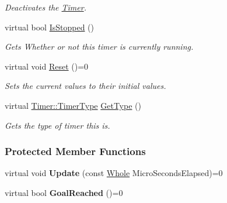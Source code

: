 \begin{DoxyCompactItemize}
\begin{DoxyCompactList}\small\item\em Deactivates the \hyperlink{classphys_1_1Timer}{Timer}. \item\end{DoxyCompactList}\item 
\hypertarget{classphys_1_1Timer_a3cdb46639055107c23c3de971d913ec1}{
virtual bool \hyperlink{classphys_1_1Timer_a3cdb46639055107c23c3de971d913ec1}{IsStopped} ()}
\label{classphys_1_1Timer_a3cdb46639055107c23c3de971d913ec1}

\begin{DoxyCompactList}\small\item\em Gets Whether or not this timer is currently running. \item\end{DoxyCompactList}\item 
\hypertarget{classphys_1_1Timer_a6010a6dab70b542c3e9d5a09caa422f7}{
virtual void \hyperlink{classphys_1_1Timer_a6010a6dab70b542c3e9d5a09caa422f7}{Reset} ()=0}
\label{classphys_1_1Timer_a6010a6dab70b542c3e9d5a09caa422f7}

\begin{DoxyCompactList}\small\item\em Sets the current values to their initial values. \item\end{DoxyCompactList}\item 
virtual \hyperlink{classphys_1_1Timer_aacbbca9cc5543fc8414de59cd085c1c1}{Timer::TimerType} \hyperlink{classphys_1_1Timer_af0eaa87bf3074047db36ba1c6fd33c70}{GetType} ()
\begin{DoxyCompactList}\small\item\em Gets the type of timer this is. \item\end{DoxyCompactList}\end{DoxyCompactItemize}
\subsubsection*{Protected Member Functions}
\begin{DoxyCompactItemize}
\item 
\hypertarget{classphys_1_1Timer_a45d7e290f9cb8c03f2376e48ff794f24}{
virtual void {\bfseries Update} (const \hyperlink{namespacephys_a460f6bc24c8dd347b05e0366ae34f34a}{Whole} MicroSecondsElapsed)=0}
\label{classphys_1_1Timer_a45d7e290f9cb8c03f2376e48ff794f24}

\item 
\hypertarget{classphys_1_1Timer_a636d546064abe43b1c549efaca777613}{
virtual bool {\bfseries GoalReached} ()=0}
\label{classphys_1_1Timer_a636d546064abe43b1c549efaca777613}

\end{DoxyCompactItemize}
